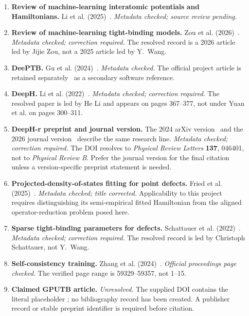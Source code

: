 \begin{enumerate}
  \item \textbf{Review of machine-learning interatomic potentials and
    Hamiltonians.} Li et al. (2025)~\cite{li2025mlreview}. \emph{Metadata
    checked; source review pending.}

  \item \textbf{Review of machine-learning tight-binding models.}
    Zou et al. (2026)~\cite{zou2026mltbReview}. \emph{Metadata checked;
    correction required.} The resolved record is a 2026 article led by Jijie
    Zou, not a 2025 article led by Y.~Wang.

  \item \textbf{DeePTB.}
    Gu et al. (2024)~\cite{gu2024deeptb}. \emph{Metadata checked.} The official
    project article is retained separately~\cite{deeptbProject2024} as a
    secondary software reference.

  \item \textbf{DeepH.}
    Li et al. (2022)~\cite{li2022deeph}. \emph{Metadata checked; correction
    required.} The resolved paper is led by He Li and appears on pages 367--377,
    not under Yuan et al. on pages 300--311.

  \item \textbf{DeepH-r preprint and journal version.}
    The 2024 arXiv version~\cite{yuan2024deephr} and the 2026 journal
    version~\cite{yuan2026deephr} describe the same research line.
    \emph{Metadata checked; correction required.} The DOI resolves to
    \emph{Physical Review Letters} \textbf{137}, 046401, not to
    \emph{Physical Review B}. Prefer the journal version for the final citation
    unless a version-specific preprint statement is needed.

  \item \textbf{Projected-density-of-states fitting for point defects.}
    Fried et al. (2025)~\cite{fried2025pointDefects}. \emph{Metadata checked;
    title corrected.} Applicability to this project requires distinguishing its
    semi-empirical fitted Hamiltonian from the aligned operator-reduction
    problem posed here.

  \item \textbf{Sparse tight-binding parameters for defects.}
    Schattauer et al. (2022)~\cite{schattauer2022defects}. \emph{Metadata
    checked; correction required.} The resolved record is led by Christoph
    Schattauer, not Y.~Wang.

  \item \textbf{Self-consistency training.}
    Zhang et al. (2024)~\cite{zhang2024selfConsistency}. \emph{Official
    proceedings page checked.} The verified page range is 59329--59357, not
    1--15.

  \item \textbf{Claimed GPUTB article.}
    \emph{Unresolved.} The supplied DOI contains the literal placeholder
    ; no bibliography record has been created. A publisher record
    or stable preprint identifier is required before citation.
\end{enumerate}

